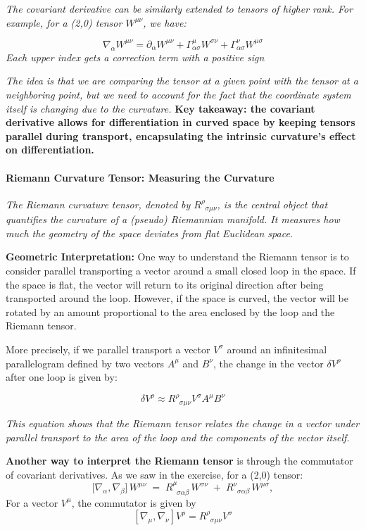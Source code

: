 \documentclass{article}
\begin{document}
\textit{The covariant derivative can be similarly extended to tensors of higher rank. For example, for a (2,0) tensor \(W^{\mu\nu}\), we have:}

\[
\nabla_\alpha W^{\mu\nu} = \partial_\alpha W^{\mu\nu} + \Gamma^\mu_{\alpha\sigma} W^{\sigma\nu} + \Gamma^\nu_{\alpha\sigma} W^{\mu\sigma}
\]
\textit{Each upper index gets a correction term with a positive sign}

\textit{The idea is that we are comparing the tensor at a given point with the tensor at a neighboring point, but we need to account for the fact that the coordinate system itself is changing due to the curvature.}
\textbf{Key takeaway: the covariant derivative allows for differentiation in curved space by keeping tensors parallel during transport, encapsulating the intrinsic curvature's effect on differentiation.}

\paragraph{Riemann Curvature Tensor: Measuring the Curvature}

\textit{The Riemann curvature tensor, denoted by \(R^\rho_{\;\;\sigma\mu\nu}\), is the central object that quantifies the curvature of a (pseudo) Riemannian manifold. It measures how much the geometry of the space deviates from flat Euclidean space.}

\textbf{Geometric Interpretation:} One way to understand the Riemann tensor is to consider parallel transporting a vector around a small closed loop in the space. If the space is flat, the vector will return to its original direction after being transported around the loop. However, if the space is curved, the vector will be rotated by an amount proportional to the area enclosed by the loop and the Riemann tensor.

More precisely, if we parallel transport a vector \(V^\sigma\) around an infinitesimal parallelogram defined by two vectors \(A^\mu\) and \(B^\nu\), the change in the vector \(\delta V^\rho\) after one loop is given by:

\[
\delta V^\rho \approx R^\rho_{\;\;\sigma\mu\nu} V^\sigma A^\mu B^\nu
\]

\textit{This equation shows that the Riemann tensor relates the change in a vector under parallel transport to the area of the loop and the components of the vector itself.}

\textbf{Another way to interpret the Riemann tensor} is through the commutator of covariant derivatives. As we saw in the exercise, for a (2,0) tensor:
\[
\bigl[\nabla_{\alpha}, \nabla_{\beta}\bigr]\,W^{\mu\nu}
\;=\;
R^\mu_{\;\;\sigma\alpha\beta}\,W^{\sigma\nu}
\;+\;
R^\nu_{\;\;\sigma\alpha\beta}\,W^{\mu\sigma},
\]
For a vector \(V^\mu\), the commutator is given by
\[
[\nabla_\mu, \nabla_\nu] V^\rho = R^\rho_{\;\;\sigma\mu\nu} V^\sigma
\]
\end{document}
